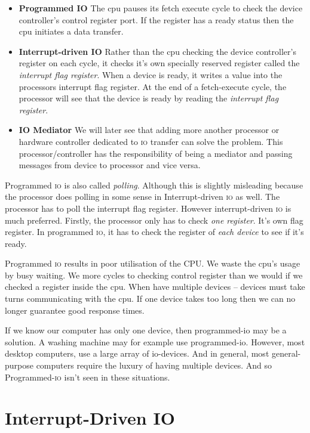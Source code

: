 \begin{itemize}   
\renewcommand{\labelitemi}{$\Box$}
\item \textbf{Programmed IO} 
The cpu pauses its fetch execute cycle to check the device controller’s control register port. 
If the register has a ready status then the cpu initiates a data transfer. 
\item \textbf{Interrupt-driven IO} 
Rather than the cpu checking the device controller's register on each cycle, it 
checks it's own specially reserved register called the \textit{interrupt flag register}. 
When a device is ready, it writes a value into the processors interrupt flag register.
At the end of a fetch-execute cycle, the processor will see that the device is ready 
by reading the \textit{interrupt flag register}. 
\item \textbf{IO Mediator} 
We will later see that adding more another processor or hardware controller dedicated 
to \textsc{io} transfer can solve the problem. This processor/controller has the responsibility 
of being a mediator and passing messages from device to processor and vice versa. 
\end{itemize}

Programmed \textsc{io} is also called \textit{polling}. Although this is slightly misleading because 
the processor does polling in some sense in Interrupt-driven \textsc{io} as well. The processor 
has to poll the interrupt flag register. However interrupt-driven \textsc{io} is much preferred.
Firstly, the processor only has to check \textit{one register}. 
It's own flag register. In programmed \textsc{io}, it has to check the register 
of \textit{each device} to see if it's ready. 

Programmed \textsc{io} results in poor utilisation of the CPU. 
We waste the cpu’s usage by busy waiting. We more cycles to checking control register than 
we would if we checked a register inside the cpu. 
When have multiple devices – devices must take turns communicating with the cpu. 
If one device takes too long then we can no longer guarantee good response times.

If we know our computer has only one device, then programmed-io may be a solution. 
A washing machine may for example use programmed-io. However, most desktop computers, 
use a large array of io-devices. And in general, most general-purpose computers require 
the luxury of having multiple devices. And so Programmed-\textsc{io} isn’t seen in 
these situations. 


\section{Interrupt-Driven IO}

